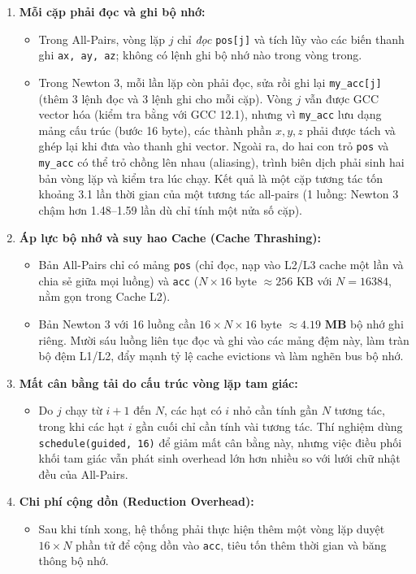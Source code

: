 \begin{enumerate}
\item \textbf{Mỗi cặp phải đọc và ghi bộ nhớ:}
\begin{itemize}
\item Trong All-Pairs, vòng lặp $j$ chỉ \emph{đọc} \texttt{pos[j]} và tích lũy vào các biến thanh ghi \texttt{ax, ay, az}; không có lệnh ghi bộ nhớ nào trong vòng trong.
\item Trong Newton 3, mỗi lần lặp còn phải đọc, sửa rồi ghi lại \texttt{my\_acc[j]} (thêm 3 lệnh đọc và 3 lệnh ghi cho mỗi cặp). Vòng $j$ vẫn được GCC vector hóa (kiểm tra bằng  với GCC 12.1), nhưng vì \texttt{my\_acc} lưu dạng mảng cấu trúc  (bước 16 byte), các thành phần $x, y, z$ phải được tách và ghép lại khi đưa vào thanh ghi vector. Ngoài ra, do hai con trỏ \texttt{pos} và \texttt{my\_acc} có thể trỏ chồng lên nhau (aliasing), trình biên dịch phải sinh hai bản vòng lặp và kiểm tra lúc chạy. Kết quả là một cặp tương tác tốn khoảng 3.1 lần thời gian của một tương tác all-pairs (1 luồng: Newton 3 chậm hơn 1.48--1.59 lần dù chỉ tính một nửa số cặp).
\end{itemize}
\item \textbf{Áp lực bộ nhớ và suy hao Cache (Cache Thrashing):}
\begin{itemize}
\item Bản All-Pairs chỉ có mảng \texttt{pos} (chỉ đọc, nạp vào L2/L3 cache một lần và chia sẻ giữa mọi luồng) và \texttt{acc} ($N \times 16$ byte $\approx 256$ KB với $N=16384$, nằm gọn trong Cache L2).
\item Bản Newton 3 với 16 luồng cần $16 \times N \times 16$ byte $\approx \mathbf{4.19\text{ MB}}$ bộ nhớ ghi riêng. Mười sáu luồng liên tục đọc và ghi vào các mảng đệm này, làm tràn bộ đệm L1/L2, đẩy mạnh tỷ lệ cache evictions và làm nghẽn bus bộ nhớ.
\end{itemize}
\item \textbf{Mất cân bằng tải do cấu trúc vòng lặp tam giác:}
\begin{itemize}
\item Do $j$ chạy từ $i+1$ đến $N$, các hạt có $i$ nhỏ cần tính gần $N$ tương tác, trong khi các hạt $i$ gần cuối chỉ cần tính vài tương tác. Thí nghiệm dùng \texttt{schedule(guided, 16)} để giảm mất cân bằng này, nhưng việc điều phối khối tam giác vẫn phát sinh overhead lớn hơn nhiều so với lưới chữ nhật đều của All-Pairs.
\end{itemize}
\item \textbf{Chi phí cộng dồn (Reduction Overhead):}
\begin{itemize}
\item Sau khi tính xong, hệ thống phải thực hiện thêm một vòng lặp duyệt $16 \times N$ phần tử để cộng dồn vào \texttt{acc}, tiêu tốn thêm thời gian và băng thông bộ nhớ.
\end{itemize}
\end{enumerate}

